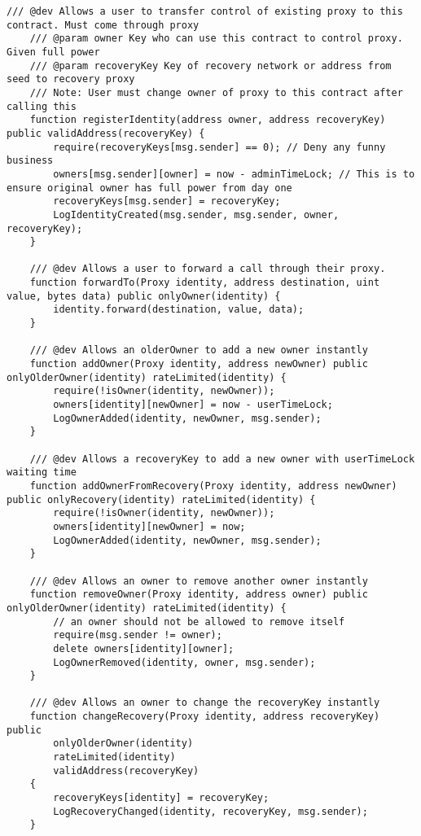 \begin{itemize}
\begin{lstlisting}[language=Solidity, numbers=none]
    /// @dev Allows a user to transfer control of existing proxy to this contract. Must come through proxy
    /// @param owner Key who can use this contract to control proxy. Given full power
    /// @param recoveryKey Key of recovery network or address from seed to recovery proxy
    /// Note: User must change owner of proxy to this contract after calling this
    function registerIdentity(address owner, address recoveryKey) public validAddress(recoveryKey) {
        require(recoveryKeys[msg.sender] == 0); // Deny any funny business
        owners[msg.sender][owner] = now - adminTimeLock; // This is to ensure original owner has full power from day one
        recoveryKeys[msg.sender] = recoveryKey;
        LogIdentityCreated(msg.sender, msg.sender, owner, recoveryKey);
    }

    /// @dev Allows a user to forward a call through their proxy.
    function forwardTo(Proxy identity, address destination, uint value, bytes data) public onlyOwner(identity) {
        identity.forward(destination, value, data);
    }

    /// @dev Allows an olderOwner to add a new owner instantly
    function addOwner(Proxy identity, address newOwner) public onlyOlderOwner(identity) rateLimited(identity) {
        require(!isOwner(identity, newOwner));
        owners[identity][newOwner] = now - userTimeLock;
        LogOwnerAdded(identity, newOwner, msg.sender);
    }

    /// @dev Allows a recoveryKey to add a new owner with userTimeLock waiting time
    function addOwnerFromRecovery(Proxy identity, address newOwner) public onlyRecovery(identity) rateLimited(identity) {
        require(!isOwner(identity, newOwner));
        owners[identity][newOwner] = now;
        LogOwnerAdded(identity, newOwner, msg.sender);
    }

    /// @dev Allows an owner to remove another owner instantly
    function removeOwner(Proxy identity, address owner) public onlyOlderOwner(identity) rateLimited(identity) {
        // an owner should not be allowed to remove itself
        require(msg.sender != owner);
        delete owners[identity][owner];
        LogOwnerRemoved(identity, owner, msg.sender);
    }

    /// @dev Allows an owner to change the recoveryKey instantly
    function changeRecovery(Proxy identity, address recoveryKey) public
        onlyOlderOwner(identity)
        rateLimited(identity)
        validAddress(recoveryKey)
    {
        recoveryKeys[identity] = recoveryKey;
        LogRecoveryChanged(identity, recoveryKey, msg.sender);
    }


\end{lstlisting}
\end{itemize}
